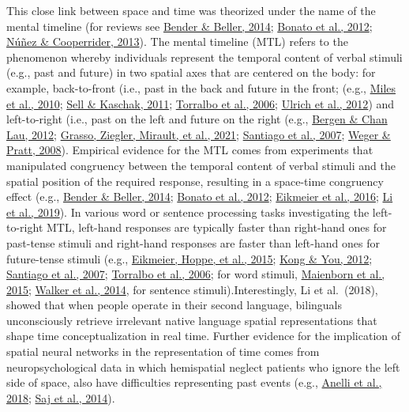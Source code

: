 \documentclass[
  a4paper,12pt,twoside,onecolumn,openright,final,oldfontcommands]{memoir}
\begin{document}
This close link between space and time was theorized under the name of the mental timeline (for reviews see \protect\hyperlink{ref-bender_mapping_2014}{Bender \& Beller, 2014}; \protect\hyperlink{ref-bonato_when_2012}{Bonato et al., 2012}; \protect\hyperlink{ref-nunez_tangle_2013}{Núñez \& Cooperrider, 2013}). The mental timeline (MTL) refers to the phenomenon whereby individuals represent the temporal content of verbal stimuli (e.g., past and future) in two spatial axes that are centered on the body: for example, back-to-front (i.e., past in the back and future in the front; (e.g., \protect\hyperlink{ref-miles_mapping_2010}{Miles et al., 2010}; \protect\hyperlink{ref-sell_processing_2011}{Sell \& Kaschak, 2011}; \protect\hyperlink{ref-torralbo_flexible_2006}{Torralbo et al., 2006}; \protect\hyperlink{ref-ulrich_past_2012}{Ulrich et al., 2012}) and left-to-right (i.e., past on the left and future on the right (e.g., \protect\hyperlink{ref-bergen_writing_2012}{Bergen \& Chan Lau, 2012}; \protect\hyperlink{ref-grasso_as_2021}{Grasso, Ziegler, Mirault, et al., 2021}; \protect\hyperlink{ref-santiago_time_2007}{Santiago et al., 2007}; \protect\hyperlink{ref-weger_time_2008}{Weger \& Pratt, 2008}). Empirical evidence for the MTL comes from experiments that manipulated congruency between the temporal content of verbal stimuli and the spatial position of the required response, resulting in a space-time congruency effect (e.g., \protect\hyperlink{ref-bender_mapping_2014}{Bender \& Beller, 2014}; \protect\hyperlink{ref-bonato_when_2012}{Bonato et al., 2012}; \protect\hyperlink{ref-lewandowska-tomaszczyk_mental_2016}{Eikmeier et al., 2016}; \protect\hyperlink{ref-li_back_2019}{Li et al., 2019}). In various word or sentence processing tasks investigating the left-to-right MTL, left-hand responses are typically faster than right-hand ones for past-tense stimuli and right-hand responses are faster than left-hand ones for future-tense stimuli (e.g., \protect\hyperlink{ref-eikmeier_response_2015}{Eikmeier, Hoppe, et al., 2015}; \protect\hyperlink{ref-kong_space-time_2012}{Kong \& You, 2012}; \protect\hyperlink{ref-santiago_time_2007}{Santiago et al., 2007}; \protect\hyperlink{ref-torralbo_flexible_2006}{Torralbo et al., 2006}; for word stimuli, \protect\hyperlink{ref-maienborn_we_2015}{Maienborn et al., 2015}; \protect\hyperlink{ref-walker_disentangling_2014}{Walker et al., 2014}, for sentence stimuli).Interestingly, Li et al.~(2018), showed that when people operate in their second language, bilinguals unconsciously retrieve irrelevant native language spatial representations that shape time conceptualization in real time. Further evidence for the implication of spatial neural networks in the representation of time comes from neuropsychological data in which hemispatial neglect patients who ignore the left side of space, also have difficulties representing past events (e.g., \protect\hyperlink{ref-anelli_effects_2018}{Anelli et al., 2018}; \protect\hyperlink{ref-saj_patients_2014}{Saj et al., 2014}).
\end{document}
